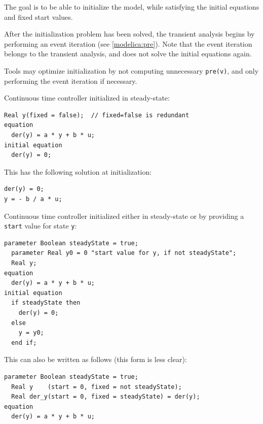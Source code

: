 \begin{nonnormative}
The goal is to be able to initialize the model, while satisfying the initial equations and fixed start values.
\end{nonnormative}

After the initialization problem has been solved, the transient analysis begins by performing an event iteration (see \cref{modelica:pre}).
Note that the event iteration belongs to the transient analysis, and does not solve the initial equations again.

\begin{nonnormative}
Tools may optimize initialization by not computing unnecessary \lstinline!pre(v)!, and only performing the event iteration if necessary.
\end{nonnormative}

\begin{example}
Continuous time controller initialized in steady-state:
\begin{lstlisting}[language=modelica]
  Real y(fixed = false);  // fixed=false is redundant
equation
  der(y) = a * y + b * u;
initial equation
  der(y) = 0;
\end{lstlisting}

This has the following solution at initialization:
\begin{lstlisting}[language=modelica]
der(y) = 0;
y = - b / a * u;
\end{lstlisting}
\end{example}

\begin{example}
Continuous time controller initialized either in steady-state or by providing a \lstinline!start! value for state \lstinline!y!:
\begin{lstlisting}[language=modelica]
  parameter Boolean steadyState = true;
  parameter Real y0 = 0 "start value for y, if not steadyState";
  Real y;
equation
  der(y) = a * y + b * u;
initial equation
  if steadyState then
    der(y) = 0;
  else
    y = y0;
  end if;
\end{lstlisting}

This can also be written as follows (this form is less clear):
\begin{lstlisting}[language=modelica]
  parameter Boolean steadyState = true;
  Real y    (start = 0, fixed = not steadyState);
  Real der_y(start = 0, fixed = steadyState) = der(y);
equation
  der(y) = a * y + b * u;
\end{lstlisting}
\end{example}

